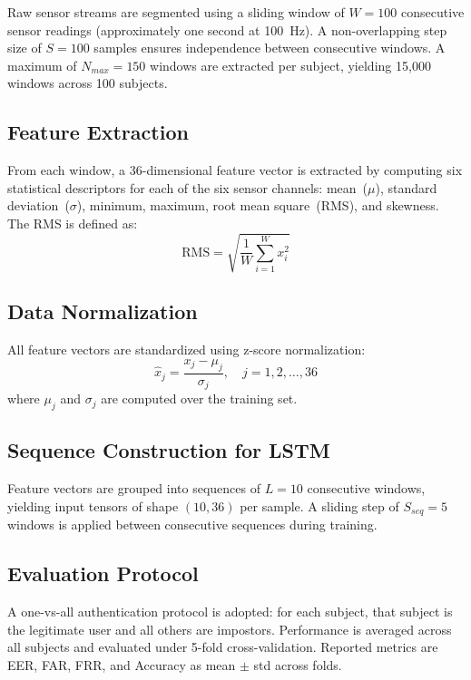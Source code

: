 \documentclass[3p,times,procedia]{elsarticle}
\begin{document}
Raw sensor streams are segmented using a sliding window of
$W = 100$ consecutive sensor readings (approximately one second
at 100~Hz). A non-overlapping step size of $S = 100$ samples
ensures independence between consecutive windows. A maximum of
$N_{max} = 150$ windows are extracted per subject, yielding
15{,}000 windows across 100 subjects.

\subsection{Feature Extraction}

From each window, a 36-dimensional feature vector is extracted
by computing six statistical descriptors for each of the six
sensor channels: mean~($\mu$), standard deviation~($\sigma$),
minimum, maximum, root mean square~(RMS), and skewness.
The RMS is defined as:
\begin{equation}
    \text{RMS} = \sqrt{\frac{1}{W}\sum_{i=1}^{W} x_i^2}
    \label{eq:rms}
\end{equation}

\subsection{Data Normalization}

All feature vectors are standardized using z-score
normalization:
\begin{equation}
    \hat{x}_j = \frac{x_j - \mu_j}{\sigma_j},
    \quad j = 1, 2, \ldots, 36
    \label{eq:zscore}
\end{equation}
where $\mu_j$ and $\sigma_j$ are computed over the training set.

\subsection{Sequence Construction for LSTM}

Feature vectors are grouped into sequences of $L = 10$
consecutive windows, yielding input tensors of shape
$(10, 36)$ per sample. A sliding step of $S_{seq} = 5$
windows is applied between consecutive sequences during
training.

\subsection{Evaluation Protocol}

A one-vs-all authentication protocol is adopted: for each
subject, that subject is the legitimate user and all others
are impostors. Performance is averaged across all subjects
and evaluated under 5-fold cross-validation. Reported metrics
are EER, FAR, FRR, and Accuracy as mean $\pm$ std across folds.
\end{document}
